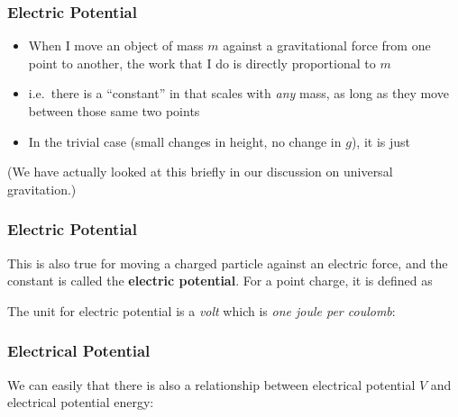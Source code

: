 \documentclass[12pt,aspectratio=169]{beamer}
\newcommand{\mb}[1]{\mathbf{#1}}
\begin{document}
\begin{frame}
  \frametitle{Electric Potential}
  \begin{itemize}
  \item When I move an object of mass $m$ against a gravitational force from
    one point to another, the work that I do is directly proportional to $m$
  \item i.e.\ there is a ``constant'' in that scales with \emph{any} mass, as
    long as they move between those same two points
  \item In the trivial case (small changes in height, no change in $g$), it is
    just

  \end{itemize}
  (We have actually looked at this briefly in our discussion on universal
  gravitation.)
\end{frame}


\begin{frame}
  \frametitle{Electric Potential}

  This is also true for moving a charged particle against an electric force,
  and the constant is called the \textbf{electric potential}. For a point
  charge, it is defined as


  The unit for electric potential is a \emph{volt} which is
  \emph{one joule per coulomb}:

\end{frame}


\begin{frame}
  \frametitle{Electrical Potential}
  
  We can easily that there is also a relationship between electrical potential
  $V$ and electrical potential energy:
  
  \vspace{-.2in}{\Large
    \begin{displaymath}
      \boxed{\Delta V=-\int\mb{E}\cdot d\mb{s}}
    \end{displaymath}
  }
\end{frame}
\end{document}
